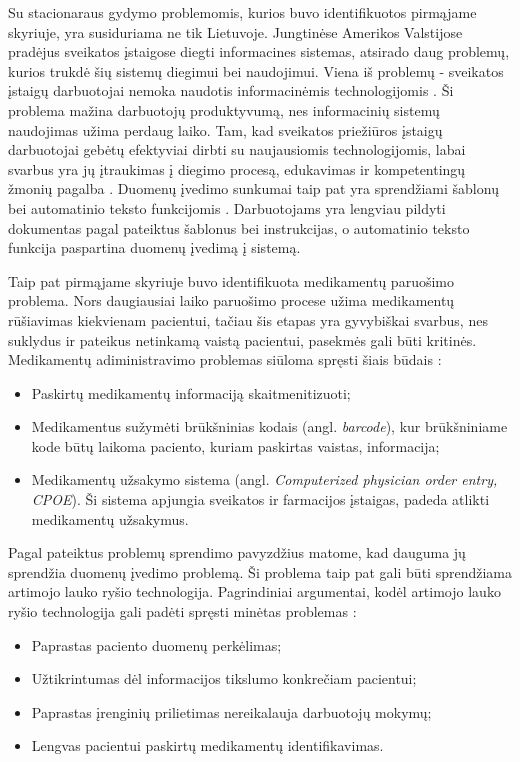 Su stacionaraus gydymo problemomis, kurios buvo identifikuotos pirmąjame skyriuje, yra susiduriama ne tik Lietuvoje. Jungtinėse Amerikos Valstijose pradėjus sveikatos įstaigose diegti informacines sistemas, atsirado daug problemų, kurios trukdė šių sistemų diegimui bei naudojimui. Viena iš problemų - sveikatos įstaigų darbuotojai nemoka naudotis informacinėmis technologijomis \cite{Jha2009}. Ši problema mažina darbuotojų produktyvumą, nes informacinių sistemų naudojimas užima perdaug laiko. Tam, kad sveikatos priežiūros įstaigų darbuotojai gebėtų efektyviai dirbti su naujausiomis technologijomis, labai svarbus yra jų įtraukimas į diegimo procesą, edukavimas ir kompetentingų žmonių pagalba \cite{Lorenzi2009}. Duomenų įvedimo sunkumai taip pat yra sprendžiami šablonų bei automatinio teksto funkcijomis \cite{Noblin2013}. Darbuotojams yra lengviau pildyti dokumentas pagal pateiktus šablonus bei instrukcijas, o automatinio teksto funkcija paspartina duomenų įvedimą į sistemą. 

Taip pat pirmąjame skyriuje buvo identifikuota medikamentų paruošimo problema. Nors daugiausiai laiko paruošimo procese užima medikamentų rūšiavimas kiekvienam pacientui, tačiau šis etapas yra gyvybiškai svarbus, nes suklydus ir pateikus netinkamą vaistą pacientui, pasekmės gali būti kritinės. Medikamentų adiministravimo problemas siūloma spręsti šiais būdais \cite{Agrawal2009}:
\begin{itemize}
    \item Paskirtų medikamentų informaciją skaitmenitizuoti;
    \item Medikamentus sužymėti brūkšninias kodais (angl. \textit{barcode}), kur brūkšniniame kode būtų laikoma paciento, kuriam paskirtas vaistas, informacija;
    \item Medikamentų užsakymo sistema (angl. \textit{Computerized physician order entry, CPOE}). Ši sistema apjungia sveikatos ir farmacijos įstaigas, padeda atlikti medikamentų užsakymus.
\end{itemize}

Pagal pateiktus problemų sprendimo pavyzdžius matome, kad dauguma jų sprendžia duomenų įvedimo problemą. Ši problema taip pat gali būti sprendžiama artimojo lauko ryšio technologija. Pagrindiniai argumentai, kodėl artimojo lauko ryšio technologija gali padėti spręsti minėtas problemas \cite{forum2}: 
\begin{itemize}
    \item Paprastas paciento duomenų perkėlimas;
    \item Užtikrintumas dėl informacijos tikslumo konkrečiam pacientui;
    \item Paprastas įrenginių prilietimas nereikalauja darbuotojų mokymų;
    \item Lengvas pacientui paskirtų medikamentų identifikavimas.
\end{itemize}